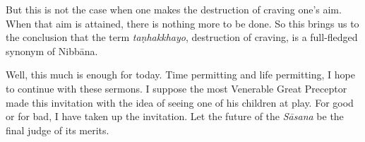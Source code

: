 But this is not the case when one makes the destruction of craving one's aim. When that aim is attained, there is nothing more to be done. So this brings us to the conclusion that the term \emph{taṇhakkhayo}, destruction of craving, is a full-fledged synonym of Nibbāna.

Well, this much is enough for today. Time permitting and life permitting, I hope to continue with these sermons. I suppose the most Venerable Great Preceptor made this invitation with the idea of seeing one of his children at play. For good or for bad, I have taken up the invitation. Let the future of the \emph{Sāsana} be the final judge of its merits.
